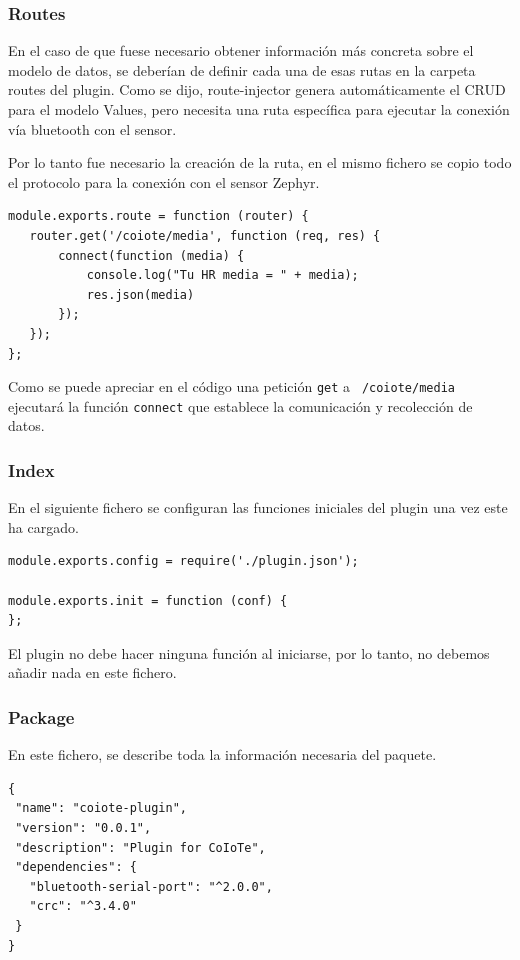 \subsubsection{Routes}

En el caso de que fuese necesario obtener información más concreta sobre el
modelo de datos, se deberían de definir cada una de esas rutas en la carpeta
routes del plugin. Como se dijo, route-injector genera automáticamente el CRUD para el modelo Values, pero necesita una ruta específica para ejecutar la conexión vía bluetooth con el sensor. 

Por lo tanto fue necesario la creación de la ruta, en el mismo fichero se copio todo el protocolo para la conexión con el sensor Zephyr. 

\begin{verbatim}
module.exports.route = function (router) {
   router.get('/coiote/media', function (req, res) {
       connect(function (media) {
           console.log("Tu HR media = " + media);
           res.json(media)
       });
   });
};
\end{verbatim}

Como se puede apreciar en el código una petición \texttt{get} a \texttt{ /coiote/media } ejecutará la función \texttt{connect} que establece la comunicación y recolección de datos.  

\subsubsection{Index}

En el siguiente fichero se configuran las funciones iniciales del plugin una vez
este ha cargado.

\begin{verbatim}
module.exports.config = require('./plugin.json');

module.exports.init = function (conf) { 
};
\end{verbatim}

El plugin no debe hacer ninguna función al iniciarse, por lo tanto, no debemos añadir nada en este fichero.
\pagebreak
\subsubsection{Package} 

En este fichero, se describe toda la información necesaria del paquete. 

\begin{verbatim}
{
 "name": "coiote-plugin",
 "version": "0.0.1",
 "description": "Plugin for CoIoTe",
 "dependencies": {
   "bluetooth-serial-port": "^2.0.0",
   "crc": "^3.4.0"
 }
}
\end{verbatim}


